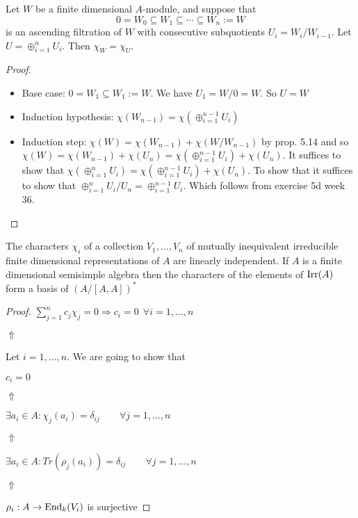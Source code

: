 \begin{prop}
Let \(W\) be a finite dimensional \(A\)-module, and suppose that
\[
0=W_{0}\subseteq W_{1}\subseteq \cdots \subseteq W_{n}:=W
\]
is an ascending filtration of \(W\) with consecutive subquotients \(U_{i}=W_{i}/W_{i-1}\). Let \(U=\oplus _{i=1}^n U_{i}\). Then \(\chi _W=\chi _U.\)
\end{prop}

\begin{proof}

\begin{itemize}
  \item Base case: \(0=W_{1}\subseteq W_{1}:=W.\) We have \(U_{1}=W/0=W.\) So \(U=W\)
  \item Induction hypothesis: \(\chi (W_{n-1})=\chi (\oplus _{i=1}^{n-1} U_{i})\)
  \item Induction step: \(\chi (W)=\chi (W_{n-1})+\chi (W/W_{n-1})\) by prop. 5.14 and so \(\chi (W)=\chi (W_{n-1})+\chi (U_{n})=\chi (\oplus _{i=1}^{n-1} U_{i})+\chi (U_{n})\). It suffices to show that \(\chi (\oplus _{i=1}^n U_{i}) =\chi (\oplus _{i=1}^{n-1} U_{i})+\chi (U_{n})\). To show that it suffices to show that \(\oplus _{i=1}^n U_{i}/U_{n}=\oplus _{i=1}^{n-1} U_{i}\). Which follows from exercise 5d week 36.
\end{itemize}

\end{proof}

\begin{thm}
The characters \(\chi _{i}\) of a collection \(V_{1},\ldots ,V_{n}\) of mutually inequivalent irreducible finite dimensional representations of \(A\) are linearly independent. If \(A\) is a finite dimensional semisimple algebra then the characters of the elements of \(\operatorname{Irr}(A)\) form a basis of \((A/[A,A])^*\)
\end{thm}

\begin{proof}
\(\sum _{j=1}^n c_{j}\chi _{j}=0 \Longrightarrow c_{i}=0\  \  \forall i=1,\ldots ,n\)

\(\Uparrow \)

Let \(i=1,\ldots ,n.\) We are going to show that

\(c_{i}=0\)

\(\Uparrow \)

\(\exists a_{i}\in A:\chi _{j}(a_{i})=\delta _{ij} \qquad \forall j=1,\ldots ,n\)

\(\Uparrow \)

\(\exists a_{i}\in A:Tr(\rho _{j}(a_{i}))=\delta _{ij} \qquad \forall j=1,\ldots ,n\)

\(\Uparrow \)

\(\rho _{i} : A\rightarrow \operatorname{End}_{k}(V_{i})\) is surjective
\end{proof}

